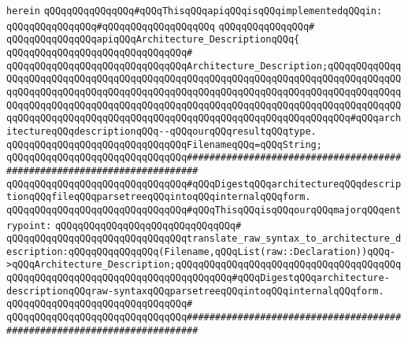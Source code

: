 \verb|herein|\newline
\newline
\verb|qQQqqQQqqQQqqQQq#qQQqThisqQQqapiqQQqisqQQqimplementedqQQqin:|\newline
\verb|qQQqqQQqqQQqqQQq#qQQqqQQqqQQqqQQqqQQq|\newline
\verb|qQQqqQQqqQQqqQQq#|\newline
\verb|qQQqqQQqqQQqqQQqapiqQQqArchitecture_DescriptionqQQq{|\newline
\verb|qQQqqQQqqQQqqQQqqQQqqQQqqQQqqQQq#|\newline
\verb|qQQqqQQqqQQqqQQqqQQqqQQqqQQqqQQqArchitecture_Description;qQQqqQQqqQQqqQQqqQQqqQQqqQQqqQQqqQQqqQQqqQQqqQQqqQQqqQQqqQQqqQQqqQQqqQQqqQQqqQQqqQQqqQQqqQQqqQQqqQQqqQQqqQQqqQQqqQQqqQQqqQQqqQQqqQQqqQQqqQQqqQQqqQQqqQQqqQQqqQQqqQQqqQQqqQQqqQQqqQQqqQQqqQQqqQQqqQQqqQQqqQQqqQQqqQQqqQQqqQQqqQQqqQQqqQQqqQQqqQQqqQQqqQQqqQQqqQQqqQQqqQQqqQQqqQQqqQQqqQQqqQQq#qQQqarchitectureqQQqdescriptionqQQq--qQQqourqQQqresultqQQqtype.|\newline
\verb|qQQqqQQqqQQqqQQqqQQqqQQqqQQqqQQqFilenameqQQq=qQQqString;|\newline
\newline
\verb|qQQqqQQqqQQqqQQqqQQqqQQqqQQqqQQq########################################################################|\newline
\verb|qQQqqQQqqQQqqQQqqQQqqQQqqQQqqQQq#qQQqDigestqQQqarchitectureqQQqdescriptionqQQqfileqQQqparsetreeqQQqintoqQQqinternalqQQqform.|\newline
\verb|qQQqqQQqqQQqqQQqqQQqqQQqqQQqqQQq#qQQqThisqQQqisqQQqourqQQqmajorqQQqentrypoint:|\newline
\verb|qQQqqQQqqQQqqQQqqQQqqQQqqQQqqQQq#|\newline
\verb|qQQqqQQqqQQqqQQqqQQqqQQqqQQqqQQqtranslate_raw_syntax_to_architecture_description:qQQqqQQqqQQqqQQq(Filename,qQQqList(raw::Declaration))qQQq->qQQqArchitecture_Description;qQQqqQQqqQQqqQQqqQQqqQQqqQQqqQQqqQQqqQQqqQQqqQQqqQQqqQQqqQQqqQQqqQQqqQQqqQQqqQQq#qQQqDigestqQQqarchitecture-descriptionqQQqraw-syntaxqQQqparsetreeqQQqintoqQQqinternalqQQqform.|\newline
\verb|qQQqqQQqqQQqqQQqqQQqqQQqqQQqqQQq#|\newline
\verb|qQQqqQQqqQQqqQQqqQQqqQQqqQQqqQQq########################################################################|\newline
\newline

